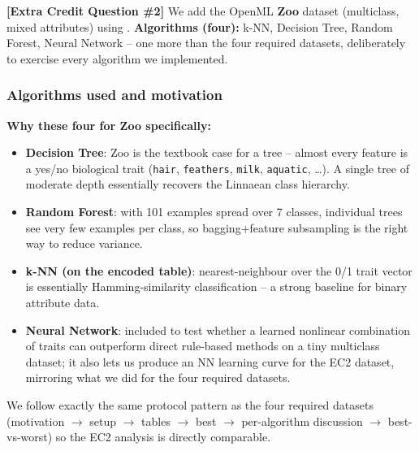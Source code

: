 \documentclass[11pt]{article}
\newcommand{\filepath}[1]{\texttt{\detokenize{#1}}}
\begin{document}
{\color{red}\textbf{[Extra Credit Question \#2]}}
We add the OpenML \textbf{Zoo} dataset (multiclass, mixed attributes) using \filepath{extra_credit2.py}. \textbf{Algorithms (four):} k-NN, Decision Tree, Random Forest, Neural Network -- one more than the four required datasets, deliberately to exercise every algorithm we implemented.

\subsubsection{Algorithms used and motivation}
\textbf{Why these four for Zoo specifically:}
\begin{itemize}
  \item \textbf{Decision Tree}: Zoo is the textbook case for a tree -- almost every feature is a yes/no biological trait (\texttt{hair}, \texttt{feathers}, \texttt{milk}, \texttt{aquatic}, \dots). A single tree of moderate depth essentially recovers the Linnaean class hierarchy.
  \item \textbf{Random Forest}: with 101 examples spread over 7 classes, individual trees see very few examples per class, so bagging+feature subsampling is the right way to reduce variance.
  \item \textbf{k-NN (on the encoded table)}: nearest-neighbour over the 0/1 trait vector is essentially Hamming-similarity classification -- a strong baseline for binary attribute data.
  \item \textbf{Neural Network}: included to test whether a learned nonlinear combination of traits can outperform direct rule-based methods on a tiny multiclass dataset; it also lets us produce an NN learning curve for the EC2 dataset, mirroring what we did for the four required datasets.
\end{itemize}
We follow exactly the same protocol pattern as the four required datasets (motivation $\rightarrow$ setup $\rightarrow$ tables $\rightarrow$ best $\rightarrow$ per-algorithm discussion $\rightarrow$ best-vs-worst) so the EC2 analysis is directly comparable.
\end{document}
